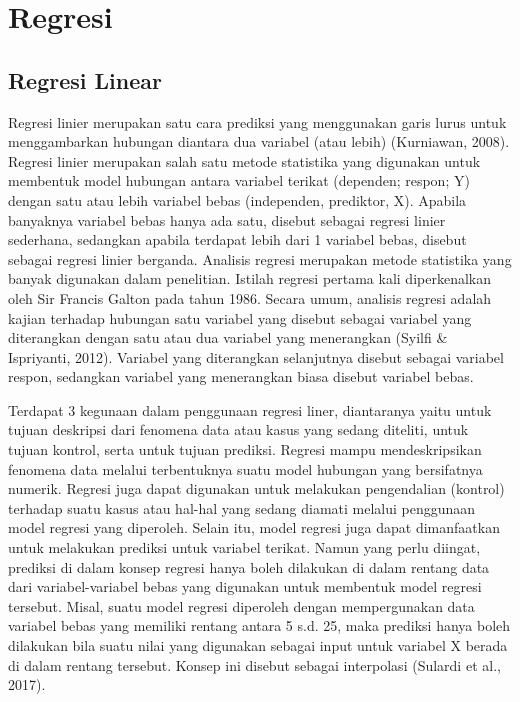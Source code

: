\section{Regresi}
\label{sec:regresi}



\subsection{Regresi Linear}
\label{subsec:regresilinear}

Regresi linier merupakan satu cara prediksi yang menggunakan garis lurus untuk menggambarkan hubungan diantara dua variabel (atau lebih) (Kurniawan, 2008). Regresi linier merupakan salah satu metode statistika yang digunakan untuk membentuk model hubungan antara variabel terikat (dependen; respon; Y) dengan satu atau lebih variabel bebas (independen, prediktor, X).  Apabila banyaknya variabel bebas hanya ada satu, disebut sebagai regresi linier sederhana, sedangkan apabila terdapat lebih dari 1 variabel bebas, disebut sebagai regresi linier berganda. Analisis regresi merupakan metode statistika yang banyak digunakan dalam penelitian. Istilah regresi pertama kali diperkenalkan oleh Sir Francis Galton pada tahun 1986.  Secara umum, analisis regresi adalah kajian terhadap hubungan satu variabel yang disebut sebagai variabel yang diterangkan dengan satu atau dua variabel yang menerangkan (Syilfi \& Ispriyanti, 2012). Variabel yang diterangkan selanjutnya disebut sebagai variabel respon, sedangkan variabel yang menerangkan biasa disebut variabel bebas. 

Terdapat 3 kegunaan dalam penggunaan regresi liner, diantaranya yaitu untuk tujuan deskripsi dari fenomena data atau kasus yang sedang diteliti, untuk tujuan kontrol, serta untuk tujuan prediksi. Regresi mampu mendeskripsikan fenomena data melalui terbentuknya suatu model hubungan yang bersifatnya numerik. Regresi juga dapat digunakan untuk melakukan pengendalian (kontrol) terhadap suatu kasus atau hal-hal yang sedang diamati melalui penggunaan model regresi yang diperoleh. Selain itu, model regresi juga dapat dimanfaatkan untuk melakukan prediksi untuk variabel terikat. Namun yang perlu diingat, prediksi di dalam konsep regresi hanya boleh dilakukan di dalam rentang data dari variabel-variabel bebas yang digunakan untuk membentuk model regresi tersebut. Misal, suatu model regresi diperoleh dengan mempergunakan data variabel bebas yang memiliki rentang antara 5 s.d. 25, maka prediksi hanya boleh dilakukan bila suatu nilai yang digunakan sebagai input untuk variabel X berada di dalam rentang tersebut. Konsep ini disebut sebagai interpolasi (Sulardi et al., 2017).

